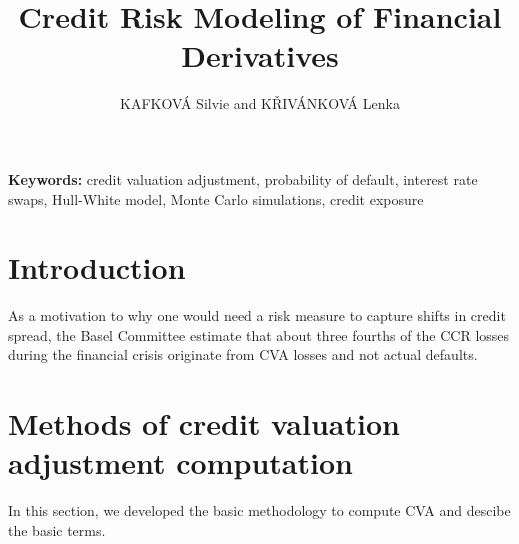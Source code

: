 \documentclass{amsart}
\theoremstyle{definition}\newtheorem{definition}[theorem]{Definition}
\theoremstyle{remark}\newtheorem{remark}[theorem]{Remark}
\begin{document}
\title{Credit Risk Modeling of Financial Derivatives}
\author{KAFKOVÁ Silvie and KŘIVÁNKOVÁ Lenka}

\begin{abstract}
\end{abstract}
\maketitle

\noindent\textbf{Keywords:} credit valuation adjustment, probability of default, interest rate swaps, Hull-White model, Monte Carlo simulations, credit exposure

\bigskip

\section{Introduction}
As a motivation to why one would need a risk measure to capture shifts in credit spread, the Basel Committee estimate that about three fourths of the CCR losses during the financial crisis originate from CVA losses and not actual defaults.

\section{Methods of credit valuation adjustment computation}
In this section, we developed the basic methodology to compute CVA and descibe the basic terms.
\end{document}
